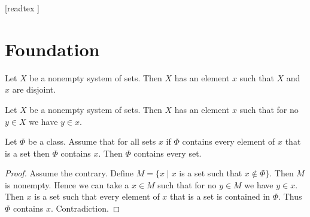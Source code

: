 \documentclass[10pt]{article}
\begin{document}
  \begin{imports}
    \begin{forthel}
      [readtex ]
    \end{forthel}
  \end{imports}


  \section{Foundation}

  \begin{forthel}
    \begin{axiom}[title=Foundation,id=FOUNDATIONS_10_1320008569323520,printid]
      Let $X$ be a nonempty system of sets.
      Then $X$ has an element $x$ such that $X$ and $x$ are disjoint.
    \end{axiom}
  \end{forthel}

  \begin{forthel}
    \begin{corollary}[id=FOUNDATIONS_10_9532145874510315,printid]
      Let $X$ be a nonempty system of sets.
      Then $X$ has an element $x$ such that for no $y \in X$ we have $y \in x$.
    \end{corollary}
  \end{forthel}

  \begin{forthel}
    \begin{proposition}[id=FOUNDATIONS_11_2812087589928960,printid]
      Let $\Phi$ be a class.
      Assume that for all sets $x$ if $\Phi$ contains every element of $x$ that is a set then $\Phi$ contains $x$.
      Then $\Phi$ contains every set.
    \end{proposition}
    \begin{proof}
      Assume the contrary.
      Define $M = \{ x \mid x$ is a set such that $x \notin \Phi \}$.
      Then $M$ is nonempty.
      Hence we can take a $x \in M$ such that for no $y \in M$ we have $y \in x$.
      Then $x$ is a set such that every element of $x$ that is a set is contained in $\Phi$.
      Thus $\Phi$ contains $x$.
      Contradiction.
    \end{proof}
  \end{forthel}
\end{document}
